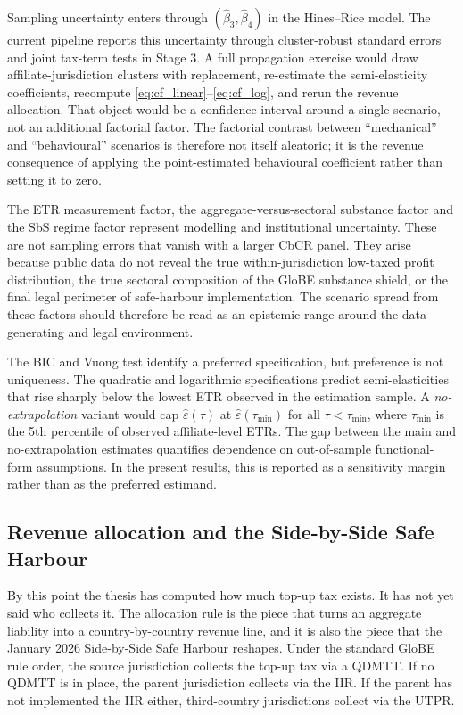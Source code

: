 \documentclass[11pt,a4paper]{article}
\begin{document}
Sampling uncertainty enters through $(\hat{\beta}_3,\hat{\beta}_4)$ in the Hines--Rice model. The current pipeline reports this uncertainty through cluster-robust standard errors and joint tax-term tests in Stage 3. A full propagation exercise would draw affiliate-jurisdiction clusters with replacement, re-estimate the semi-elasticity coefficients, recompute \eqref{eq:cf_linear}--\eqref{eq:cf_log}, and rerun the revenue allocation. That object would be a confidence interval around a single scenario, not an additional factorial factor. The factorial contrast between ``mechanical'' and ``behavioural'' scenarios is therefore not itself aleatoric; it is the revenue consequence of applying the point-estimated behavioural coefficient rather than setting it to zero.

The ETR measurement factor, the aggregate-versus-sectoral substance factor and the SbS regime factor represent modelling and institutional uncertainty. These are not sampling errors that vanish with a larger CbCR panel. They arise because public data do not reveal the true within-jurisdiction low-taxed profit distribution, the true sectoral composition of the GloBE substance shield, or the final legal perimeter of safe-harbour implementation. The scenario spread from these factors should therefore be read as an epistemic range around the data-generating and legal environment.

The BIC and Vuong test identify a preferred specification, but preference is not uniqueness. The quadratic and logarithmic specifications predict semi-elasticities that rise sharply below the lowest ETR observed in the estimation sample. A \emph{no-extrapolation} variant would cap $\hat{\varepsilon}(\tau)$ at $\hat{\varepsilon}(\tau_{\min})$ for all $\tau < \tau_{\min}$, where $\tau_{\min}$ is the 5th percentile of observed affiliate-level ETRs. The gap between the main and no-extrapolation estimates quantifies dependence on out-of-sample functional-form assumptions. In the present results, this is reported as a sensitivity margin rather than as the preferred estimand.

\subsection{Revenue allocation and the Side-by-Side Safe Harbour}\label{sec:sbs}\label{sec:jan2026}

By this point the thesis has computed how much top-up tax exists. It has not yet said who collects it. The allocation rule is the piece that turns an aggregate liability into a country-by-country revenue line, and it is also the piece that the January 2026 Side-by-Side Safe Harbour reshapes. Under the standard GloBE rule order, the source jurisdiction collects the top-up tax via a QDMTT. If no QDMTT is in place, the parent jurisdiction collects via the IIR. If the parent has not implemented the IIR either, third-country jurisdictions collect via the UTPR.
\end{document}
